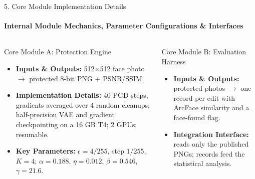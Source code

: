 \documentclass[aspectratio=169, 11pt]{beamer}
\begin{document}
\begin{frame}{5. Core Module Implementation Details}
    \framesubtitle{Internal Module Mechanics, Parameter Configurations \& Interfaces}
    \begin{columns}[T]
        \begin{block}{Core Module A: Protection Engine}
            \scriptsize
            \begin{itemize}
                \item \textbf{Inputs \& Outputs:} 512$\times$512 face photo $\rightarrow$ protected 8-bit PNG + PSNR/SSIM.
                \item \textbf{Implementation Details:} 40 PGD steps, gradients averaged over 4 random cleanups; half-precision VAE and gradient checkpointing on a 16 GB T4; 2 GPUs; resumable.
                \item \textbf{Key Parameters:} $\epsilon=4/255$, step $1/255$, $K=4$; $\alpha=0.188$, $\eta=0.012$, $\beta=0.546$, $\gamma=21.6$.
            \end{itemize}
        \end{block}

        \begin{block}{Core Module B: Evaluation Harness}
            \scriptsize
            \begin{itemize}
                \item \textbf{Inputs \& Outputs:} protected photos $\rightarrow$ one record per edit with ArcFace similarity and a face-found flag.
                \item \textbf{Integration Interface:} reads only the published PNGs; records feed the statistical analysis.
            \end{itemize}
        \end{block}


\end{columns}
\end{frame}
\end{document}
